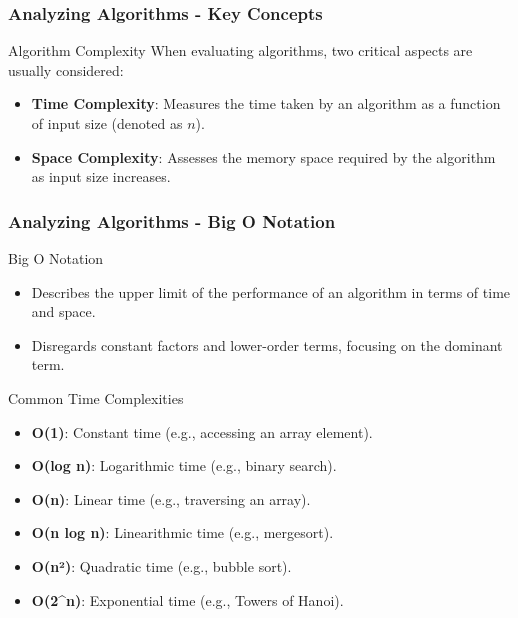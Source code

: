 \documentclass{beamer}
\begin{document}
\begin{frame}[fragile]
    \frametitle{Analyzing Algorithms - Key Concepts}

    \begin{block}{Algorithm Complexity}
        When evaluating algorithms, two critical aspects are usually considered:
        \begin{itemize}
            \item \textbf{Time Complexity}: Measures the time taken by an algorithm as a function of input size (denoted as $n$).
            \item \textbf{Space Complexity}: Assesses the memory space required by the algorithm as input size increases.
        \end{itemize}
    \end{block}
\end{frame}

\begin{frame}[fragile]
    \frametitle{Analyzing Algorithms - Big O Notation}

    \begin{block}{Big O Notation}
        \begin{itemize}
            \item Describes the upper limit of the performance of an algorithm in terms of time and space.
            \item Disregards constant factors and lower-order terms, focusing on the dominant term.
        \end{itemize}
    \end{block}

    \begin{block}{Common Time Complexities}
        \begin{itemize}
            \item \textbf{O(1)}: Constant time (e.g., accessing an array element).
            \item \textbf{O(log n)}: Logarithmic time (e.g., binary search).
            \item \textbf{O(n)}: Linear time (e.g., traversing an array).
            \item \textbf{O(n log n)}: Linearithmic time (e.g., mergesort).
            \item \textbf{O(n²)}: Quadratic time (e.g., bubble sort).
            \item \textbf{O(2^n)}: Exponential time (e.g., Towers of Hanoi).
        \end{itemize}
    \end{block}
\end{frame}
\end{document}
